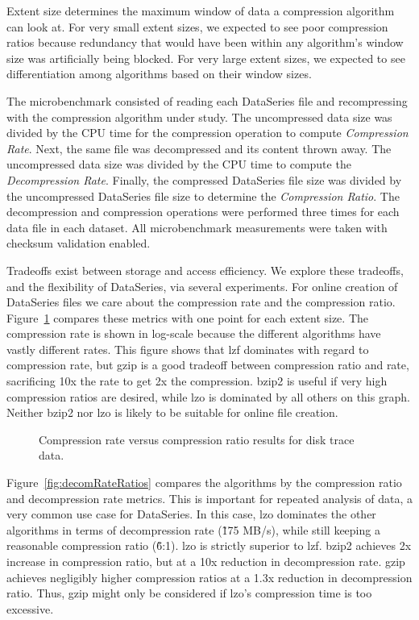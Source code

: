 \documentclass{acm_proc_article-sp}
\begin{document}
Extent size determines the maximum window of data a compression
algorithm can look at.  For very small extent sizes, we expected to
see poor compression ratios because redundancy that would have been
within any algorithm's window size was artificially being blocked.
For very large extent sizes, we expected to see differentiation among
algorithms based on their window sizes.

The microbenchmark consisted of reading each DataSeries file
and recompressing with the compression
algorithm under study.  The uncompressed data size was divided by the CPU time for the compression
operation  to compute {\em
Compression Rate}.  Next, the same file was decompressed and its
content thrown away.  The uncompressed data size was divided by the CPU time 
to compute the {\em Decompression Rate}.  
Finally, the compressed DataSeries file size was
divided by the uncompressed DataSeries file size to determine the {\em
Compression Ratio}.  The decompression and compression operations were
performed three times for each data file in each dataset.  All microbenchmark 
measurements were taken with checksum validation enabled.

Tradeoffs exist between storage and access efficiency.  We
explore these tradeoffs, and the flexibility of DataSeries, via
several experiments.
For online creation of DataSeries files we care about the compression
rate and the compression ratio.
Figure~\ref{fig:comRateRatios} compares these metrics
with one point for each extent size.  The compression rate is shown
in log-scale because the different algorithms have vastly different rates.
This figure shows that lzf dominates
with regard to compression rate, but gzip is a good tradeoff between
compression ratio and rate, sacrificing 10x the rate to get 2x
the compression.  bzip2 is useful if very high compression
ratios are desired, while lzo is dominated by all others on this graph.
Neither bzip2 nor lzo is likely to be suitable for online file creation.


\begin{figure}[tbh]
\caption{ Compression rate versus compression ratio results for disk trace data.}
\label{fig:comRateRatios}
\end{figure}

Figure~\ref{fig:decomRateRatios} compares the algorithms by the
compression ratio and decompression rate metrics.  This is important
for repeated analysis of data, a very common use case for
DataSeries.  In this case, lzo dominates the other algorithms in
terms of decompression rate (\~175 MB/s), while still keeping a
reasonable compression ratio (\~6:1). lzo is strictly superior to lzf.
bzip2 achieves 
2x increase in compression ratio, but at a 
10x
reduction in decompression rate.  gzip achieves negligibly higher
compression ratios at a 
1.3x reduction in decompression ratio.
Thus, gzip might only be considered if
lzo's compression time is too excessive.
\end{document}
